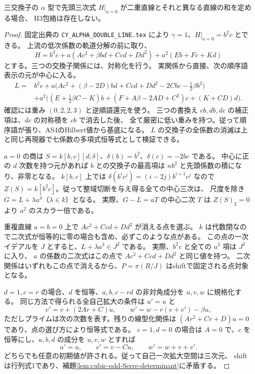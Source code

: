 \begin{proposition}\label{prop:cubic-CY-three-alpha-double-empty}
三交換子の $\alpha$ 型で先頭三次式 $H|_{a=0}$ が二重直線とそれと異なる直線の和を定める場合、
H3包絡は存在しない。
\end{proposition}
\begin{proof}
固定出典\cite{AS4CYpinned}の \texttt{CY\_ALPHA\_DOUBLE\_LINE.tex}
により $\gamma=1$、$H|_{a=0}=b^2c$ とできる。
上流の低次係数の軌道分解の前に取り、
\[
 H=b^2c+a(Ac^2+\beta bd+Ccd+Dd^2)+a^2(Eb+Fc+Kd)
\]
とする。三つの交換子関係には、対称化を行う。
実関係から直接、次の順序語表示の元が中心に入る。
\begin{align*}
 L={}&b^2c+a\bigl(Ac^2+(\beta-2D)bd+Ccd+Dd^2-2Cbc-\tfrac12\beta b^2\bigr)\\
    &+a^2\bigl((E+\tfrac12\beta C-K)b+(F+A\beta-2AD+C^2)c+(K+CD)d\bigr).
\end{align*}
確認には重み $(0,2,2,3)$ と逆順語還元を使う。
三つの書換え $cb,db,dc$ の補正項は、$dc$ の対称積を $cb$ で消去した後、
全て厳密に低い重みを持つ。従って順序語が張り、AS4のHilbert値から基底になる。
$L$ の交換子の全係数の消滅は上と同じ再現器で七係数の多項式恒等式として検証できる。

$a=0$ の商は $S=k[b,c][d;\delta]$、$\delta(b)=b^2$、$\delta(c)=-2bc$ である。
中心に正の $d$ 次数を持つ元があれば $b$ との交換子の最高項は
$n b^2$ と先頭係数の積になり、非零となる。
$k[b,c]$ 上では $\delta(b^i c^j)=(i-2j)b^{i+1}c^j$ なので
$Z(S)=k[b^2c]$。従って整域切断を与え得る全ての中心三次は、
尺度を除き $G=L+\lambda a^3$（$\lambda\in k$）となる。
実際、$G-L=aT$ の中心二次 $T$ は $Z(S)_2=0$ より $a^2$ のスカラー倍である。

重複直線 $a=b=0$ 上で $Ac^2+Ccd+Dd^2$ が消える点を選ぶ。
$k$ は代数閉なので二次式が恒等的に零の場合も含め、必ずこのような点がある。
この点の一次イデアルを $J$ とすると、$L+\lambda a^3\in J^2$ である。
実際、$b^2c$ と全ての $a^2$ 項は $J^2$ に入り、
$a$ の係数の二次式はこの点で $Ac^2+Ccd+Dd^2$ と同じ値を持つ。
二次関係はいずれもこの点で消えるから、$P=\pi(R/J)$ はshiftで固定される点対象となる。

$d=1,c=r$ の場合、$d$ を恒等、$a,b,c-rd$ の非対角成分を $u,v,w$ に規格化する。
同じ方法で得られる全自己拡大の条件は $u'=u$ と
\[
 v'=v+(2Ar+C)u,\qquad
 w'=w-r(v+v')-\beta u,
\]
ただしプライムは次の次数を表す。残りの線型化関係は
$(Ar^2+Cr+D)u=0$ であり、点の選び方により恒等式である。
$c=1,d=0$ の場合は $A=0$ で、$c$ を恒等にし、$a,b,d$ の成分を $u,v,w$ とすれば
\[
 u'=u,\qquad v'=v-Cu,\qquad w'=w+v+v' .
\]
どちらでも任意の初期値が許される。従って自己一次拡大空間は三次元、
shiftは行列式1であり、補題\ref{lem:cubic-odd-Serre-determinant}に矛盾する。
\end{proof}

